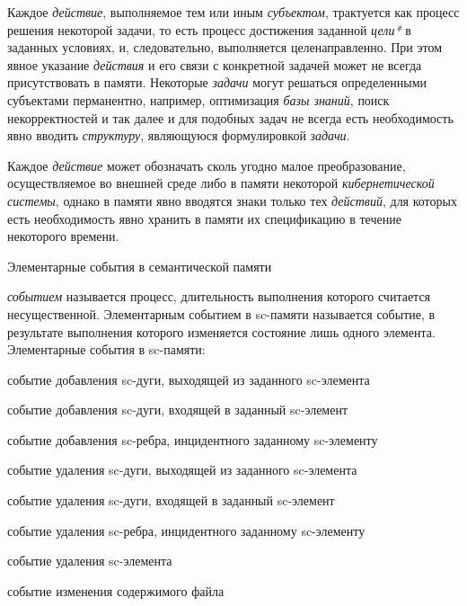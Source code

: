 \begin{frame}{}
\justifying
\vspace{10mm}
Каждое \textit{действие}, выполняемое тем или иным \textit{субъектом}, трактуется как процесс решения некоторой задачи, то есть процесс достижения заданной \textit{цели*} в заданных условиях, и, следовательно, выполняется целенаправленно. При этом явное указание \textit{действия} и его связи с конкретной задачей может не всегда присутствовать в памяти. Некоторые \textit{задачи} могут решаться определенными субъектами перманентно, например, оптимизация \textit{базы знаний}, поиск некорректностей и так далее и для подобных задач не всегда есть необходимость явно вводить \textit{структуру}, являющуюся формулировкой \textit{задачи}.

Каждое \textit{действие} может обозначать сколь угодно малое преобразование, осуществляемое во внешней среде либо в памяти некоторой \textit{кибернетической системы}, однако в памяти явно вводятся знаки только тех \textit{действий}, для которых есть необходимость явно хранить в памяти их спецификацию в течение некоторого времени.
\end{frame}

\begin{frame}{Элементарные события в семантической памяти}
\topline
\justifying
\vspace{10mm}

\textit{событием} называется процесс, длительность выполнения которого считается несущественной. Элементарным событием в sc-памяти называется событие, в результате выполнения которого изменяется состояние лишь одного элемента.
Элементарные события в sc-памяти:
\begin{textitemize}
    \item событие добавления sc-дуги, выходящей из заданного sc-элемента
    \item событие добавления sc-дуги, входящей в заданный sc-элемент
    \item событие добавления sc-ребра, инцидентного заданному sc-элементу
    \item событие удаления sc-дуги, выходящей из заданного sc-элемента
    \item событие удаления sc-дуги, входящей в заданный sc-элемент
    \item событие удаления sc-ребра, инцидентного заданному sc-элементу
    \item событие удаления sc-элемента
    \item событие изменения содержимого файла
\end{textitemize}
\end{frame}

